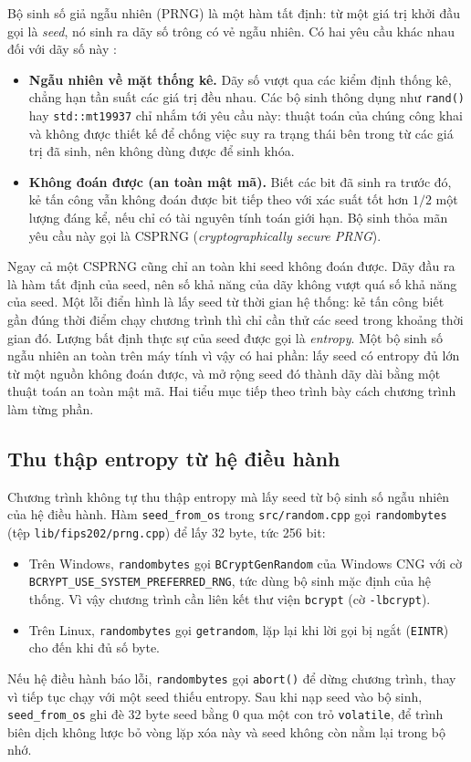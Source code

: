 Bộ sinh số giả ngẫu nhiên (PRNG) là một hàm tất định: từ một giá trị khởi đầu gọi là \emph{seed}, nó sinh ra dãy số trông có vẻ ngẫu nhiên. Có hai yêu cầu khác nhau đối với dãy số này \cite{menezes1996handbook}:
\begin{itemize}
  \item \textbf{Ngẫu nhiên về mặt thống kê.} Dãy số vượt qua các kiểm định thống kê, chẳng hạn tần suất các giá trị đều nhau. Các bộ sinh thông dụng như \texttt{rand()} hay \texttt{std::mt19937} chỉ nhắm tới yêu cầu này: thuật toán của chúng công khai và không được thiết kế để chống việc suy ra trạng thái bên trong từ các giá trị đã sinh, nên không dùng được để sinh khóa.
  \item \textbf{Không đoán được (an toàn mật mã).} Biết các bit đã sinh ra trước đó, kẻ tấn công vẫn không đoán được bit tiếp theo với xác suất tốt hơn $1/2$ một lượng đáng kể, nếu chỉ có tài nguyên tính toán giới hạn. Bộ sinh thỏa mãn yêu cầu này gọi là CSPRNG (\emph{cryptographically secure PRNG}).
\end{itemize}

Ngay cả một CSPRNG cũng chỉ an toàn khi seed không đoán được. Dãy đầu ra là hàm tất định của seed, nên số khả năng của dãy không vượt quá số khả năng của seed. Một lỗi điển hình là lấy seed từ thời gian hệ thống: kẻ tấn công biết gần đúng thời điểm chạy chương trình thì chỉ cần thử các seed trong khoảng thời gian đó. Lượng bất định thực sự của seed được gọi là \emph{entropy}. Một bộ sinh số ngẫu nhiên an toàn trên máy tính vì vậy có hai phần: lấy seed có entropy đủ lớn từ một nguồn không đoán được, và mở rộng seed đó thành dãy dài bằng một thuật toán an toàn mật mã. Hai tiểu mục tiếp theo trình bày cách chương trình làm từng phần.

\subsection{Thu thập entropy từ hệ điều hành}

Chương trình không tự thu thập entropy mà lấy seed từ bộ sinh số ngẫu nhiên của hệ điều hành. Hàm \texttt{seed\_from\_os} trong \texttt{src/random.cpp} gọi \texttt{randombytes} (tệp \texttt{lib/fips202/prng.cpp}) để lấy 32 byte, tức 256 bit:
\begin{itemize}
  \item Trên Windows, \texttt{randombytes} gọi \texttt{BCryptGenRandom} của Windows CNG với cờ \texttt{BCRYPT\_\allowbreak{}USE\_\allowbreak{}SYSTEM\_\allowbreak{}PREFERRED\_\allowbreak{}RNG}, tức dùng bộ sinh mặc định của hệ thống. Vì vậy chương trình cần liên kết thư viện \texttt{bcrypt} (cờ \texttt{-lbcrypt}).
  \item Trên Linux, \texttt{randombytes} gọi \texttt{getrandom}, lặp lại khi lời gọi bị ngắt (\texttt{EINTR}) cho đến khi đủ số byte.
\end{itemize}
Nếu hệ điều hành báo lỗi, \texttt{randombytes} gọi \texttt{abort()} để dừng chương trình, thay vì tiếp tục chạy với một seed thiếu entropy. Sau khi nạp seed vào bộ sinh, \texttt{seed\_from\_os} ghi đè 32 byte seed bằng 0 qua một con trỏ \texttt{volatile}, để trình biên dịch không lược bỏ vòng lặp xóa này và seed không còn nằm lại trong bộ nhớ.

